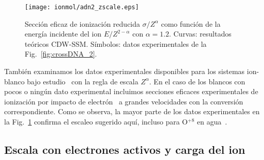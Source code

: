 \begin{figure}
\centering
\texttt{[image: ionmol/adn2\_zscale.eps]}
\caption[Sección eficaz de ionización reducida por $Z$ y $\alpha$ 
(Parte II).]
{Sección eficaz de ionización reducida $\sigma/Z^{\alpha}$ como función
de la energía incidente del ion $E/Z^{2-\alpha}$ con $\alpha=1.2$. 
Curvas: resultados teóricos CDW-SSM. 
Símbolos: datos experimentales de la Fig.~\ref{fig:crossDNA_2}.}
\label{fig:zreduced}
\end{figure} 

También examinamos los datos experimentales disponibles para los sistemas
ion-blanco bajo estudio~\cite{Iriki:11,Sens:20,Bhattacharjee:19,itoh2013,
wolff2014,wang2016,agnihotri2012,agnihotri2013,Luna2007,Bolorizadeh86,
H_Rudd85,He_Rudd85,toburen80,Ohsawa05,Bhattacharjee:17,DalCappello:09,
Bhattacharjee:16} con la regla de escala $Z^\alpha$. En el caso de los 
blancos con pocos o ningún dato experimental incluimos secciones eficaces 
experimentales de ionización por impacto de electrón~\cite{Rahman:16,
bug2017,wolf2019,fuss2009} a grandes velocidades con la conversión 
correspondiente. Como se observa, la mayor parte de los datos 
experimentales en la Fig.~\ref{fig:zreduced} confirma el escaleo sugerido 
aquí, incluso para O$^{+8}$ en agua~\cite{Bhattacharjee:16}. 

\subsection{Escala con electrones activos y carga del ion}
\label{sec:nez_scaling}

